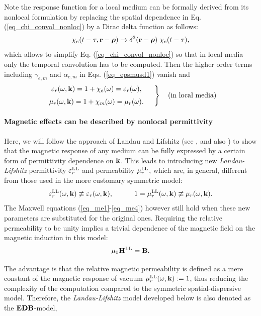 Note the response function for a local medium can be formally derived from its nonlocal formulation by replacing the spatial dependence in Eq. (\ref{eq_chi_convol_nonloc}) by a Dirac delta function as follows: %
\begin{equation} \chi_e(t-\tau, {\mathbf{r}}-\boldsymbol{\rho}) \rightarrow \delta^{3}({\mathbf{r}}-\boldsymbol{\rho}) \; \chi_e(t-\tau), \label{eq_loc_chi}\end{equation}
which allows to simplify Eq. (\ref{eq_chi_convol_nonloc}) so that in local media only the temporal convolution has to be computed. Then the higher order terms including $\gamma_{e,m}$ and $\alpha_{e,m}$ in Eqs. (\ref{eq_epsmusd1}) vanish and
\begin{equation} 
\left.  \begin{array}{c}
\epsrn(\omega,\kk) = 1 + \chi_e(\omega) = \epsrl(\omega), \medskip \\
\murn(\omega,\kk) = 1 + \chi_m(\omega) = \murl(\omega). 
\end{array} \quad \right\} \quad \text{(in local media)}
\label{eq_epsmusd2}\end{equation}

\paragraph{Magnetic effects can be described by nonlocal permittivity} %
Here, we will follow the approach of Landau and Lifshitz (see \cite{landau1984electrodynamics}, and also \cite{krowne2007book_agran, agranovich2006spatial}) to show that the magnetic response of any medium can be fully expressed by a certain form of permittivity dependence on ${\mathbf{k}}$. This leads to introducing new \textit{Landau-Lifshitz} permittivity $\varepsilon_r^\text{LL}$ and permeability $\mu_r^\text{LL}$, which are, in general, different from those used in the more customary symmetric model:
$$\varepsilon_r^\text{LL}(\omega, {\mathbf{k}}) \not\equiv \varepsilon_r(\omega, {\mathbf{k}}),\quad\quad\quad 1 = \mu_r^\text{LL}(\omega, {\mathbf{k}}) \not\equiv \mu_r(\omega, {\mathbf{k}}).$$
The Maxwell equations (\ref{eq_me1}-\ref{eq_me4}) however still hold when these new parameters are substituted for the original ones. Requiring the relative permeability to be unity implies a trivial dependence of the magnetic field on the magnetic induction in this model:
$$ \mu_0 {\mathbf{H}^\text{LL}} = \mathbf{B}. $$

The advantage is that the relative magnetic permeability is defined as a mere constant of the magnetic response of vacuum $\mu_r^\text{LL}(\omega, {\mathbf{k}}) := 1$, thus reducing the complexity of the computation compared to the symmetric spatial-dispersive model. %
Therefore, the \textit{Landau-Lifshitz} model developed below is also denoted as the $\mathbf{E}\mathbf{D}\mathbf{B}$-model, 

